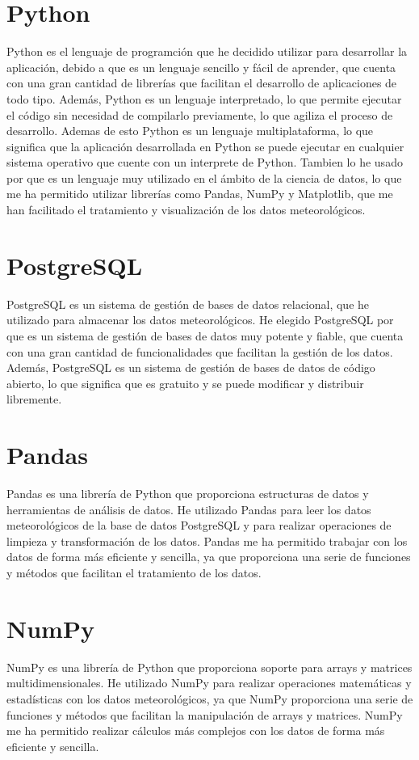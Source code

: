 \section{Python} 
Python es el lenguaje de programción que he decidido utilizar para desarrollar la aplicación, debido a que es un lenguaje sencillo y fácil de aprender, que cuenta con una gran cantidad de librerías que facilitan el desarrollo de aplicaciones de todo tipo. Además, Python es un lenguaje interpretado, lo que permite ejecutar el código sin necesidad de compilarlo previamente, lo que agiliza el proceso de desarrollo.\newline
Ademas de esto Python es un lenguaje multiplataforma, lo que significa que la aplicación desarrollada en Python se puede ejecutar en cualquier sistema operativo que cuente con un interprete de Python. \newline
Tambien lo he usado por que es un lenguaje muy utilizado en el ámbito de la ciencia de datos, lo que me ha permitido utilizar librerías como Pandas, NumPy y Matplotlib, que me han facilitado el tratamiento y visualización de los datos meteorológicos.\newline
\section{PostgreSQL}
PostgreSQL es un sistema de gestión de bases de datos relacional, que he utilizado para almacenar los datos meteorológicos. He elegido PostgreSQL por que es un sistema de gestión de bases de datos muy potente y fiable, que cuenta con una gran cantidad de funcionalidades que facilitan la gestión de los datos. Además, PostgreSQL es un sistema de gestión de bases de datos de código abierto, lo que significa que es gratuito y se puede modificar y distribuir libremente.\newline
\section{Pandas}
Pandas es una librería de Python que proporciona estructuras de datos y herramientas de análisis de datos. He utilizado Pandas para leer los datos meteorológicos de la base de datos PostgreSQL y para realizar operaciones de limpieza y transformación de los datos. Pandas me ha permitido trabajar con los datos de forma más eficiente y sencilla, ya que proporciona una serie de funciones y métodos que facilitan el tratamiento de los datos.\newline
\section{NumPy}
NumPy es una librería de Python que proporciona soporte para arrays y matrices multidimensionales. He utilizado NumPy para realizar operaciones matemáticas y estadísticas con los datos meteorológicos, ya que NumPy proporciona una serie de funciones y métodos que facilitan la manipulación de arrays y matrices. NumPy me ha permitido realizar cálculos más complejos con los datos de forma más eficiente y sencilla.\newline
